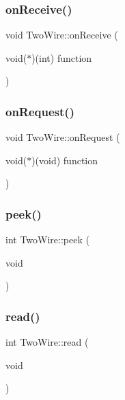 \subsubsection{\texorpdfstring{on\+Receive()}{onReceive()}}
{\footnotesize\ttfamily void Two\+Wire\+::on\+Receive (\begin{DoxyParamCaption}\item[{void($\ast$)(int)}]{function }\end{DoxyParamCaption})}

\mbox{\label{class_two_wire_a224bf8799dda398fc0db223801852ca5}} 
\subsubsection{\texorpdfstring{on\+Request()}{onRequest()}}
{\footnotesize\ttfamily void Two\+Wire\+::on\+Request (\begin{DoxyParamCaption}\item[{void($\ast$)(void)}]{function }\end{DoxyParamCaption})}

\mbox{\label{class_two_wire_a5bd64cb7bd609e9470a15d96a0991ec8}} 
\subsubsection{\texorpdfstring{peek()}{peek()}}
{\footnotesize\ttfamily int Two\+Wire\+::peek (\begin{DoxyParamCaption}\item[{void}]{ }\end{DoxyParamCaption})\hspace{0.3cm}{\ttfamily [virtual]}}

\mbox{\label{class_two_wire_aa361b83500d00dfb93bb25b6473b33e9}} 
\subsubsection{\texorpdfstring{read()}{read()}}
{\footnotesize\ttfamily int Two\+Wire\+::read (\begin{DoxyParamCaption}\item[{void}]{ }\end{DoxyParamCaption})\hspace{0.3cm}{\ttfamily [virtual]}}

